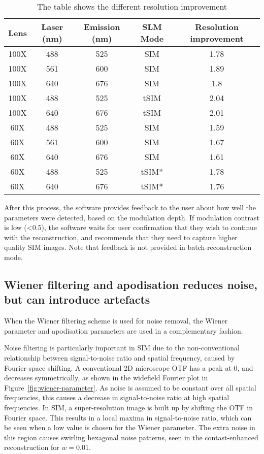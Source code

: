 \begin{table}
\caption[LAG SIM: Resolution improvement for different lenses, wavelengths, and SLM grating patterns]{\label{tab:resolution}The table shows the different resolution improvement} %
\centering
\begin{tabular}{|c|c|c|c|c|}
\hline
Lens &	Laser (nm) &	Emission (nm) & SLM Mode & Resolution improvement \\ \hline
100X &	488 &	525 &	SIM &	1.78 \\
100X &	561 &	600 &	SIM &	1.89 \\
100X &	640 &	676 &	SIM &	1.8 \\
100X &	488 &	525 &	tSIM &	2.04 \\
100X &	640 &	676 &	tSIM &	2.01 \\
60X &	488 &	525 &	SIM &	1.59 \\
60X &	561 &	600 &	SIM &	1.67 \\
60X &	640 &	676 &	SIM &	1.61 \\
60X &	488 &	525 &	tSIM* &	1.78 \\
60X &	640 &	676 &	tSIM* &	1.76 \\ \hline
\end{tabular}
\end{table}

After this process, the software provides feedback to the user about how well the parameters were detected, based on the modulation depth. 
If modulation contrast is low (<0.5), the software waits for user confirmation that they wish to continue with the reconstruction, and recommends that they need to capture higher quality SIM images. 
Note that feedback is not provided in batch-reconstruction mode. 

\subsection{Wiener filtering and apodisation reduces noise, but can introduce artefacts}
When the Wiener filtering scheme is used for noise removal, the Wiener parameter and apodisation parameters are used in a complementary fashion. 

Noise filtering is particularly important in SIM due to the non-conventional relationship between signal-to-noise ratio and spatial frequency, caused by Fourier-space shifting. 
A conventional 2D microscope OTF has a peak at 0, and decreases symmetrically, as shown in the widefield Fourier plot in Figure~\ref{fig:wiener-parameter}. 
As noise is assumed to be constant over all spatial frequencies, this causes a decrease in signal-to-noise ratio at high spatial frequencies. 
In SIM, a super-resolution image is built up by shifting the OTF in Fourier space. 
This results in a local maxima in signal-to-noise ratio, which can be seen when a low value is chosen for the Wiener parameter. 
The extra noise in this region causes swirling hexagonal noise patterns, seen in the contast-enhanced reconstruction for $w=0.01$. 

